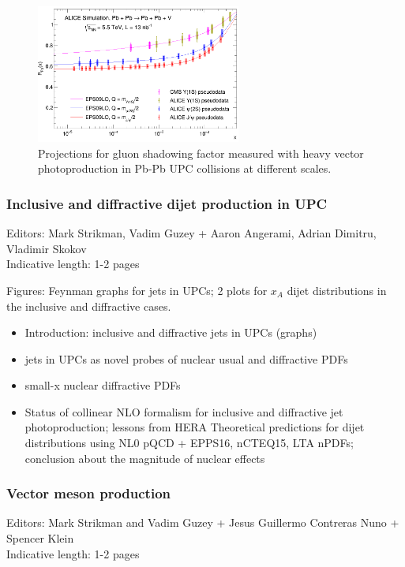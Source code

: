 \documentclass[../report.tex]{subfiles}
\begin{document}
\begin{figure}
\centering
\includegraphics[width=0.6\textwidth]{figs/suppression_factor.png}
\caption{Projections for gluon shadowing factor measured with heavy vector photoproduction in Pb-Pb UPC collisions at different scales.}
\label{fig:r}
\end{figure}

\subsubsection{Inclusive and diffractive dijet production in UPC}
Editors: Mark Strikman, Vadim Guzey + Aaron Angerami, Adrian Dimitru, Vladimir Skokov\\
Indicative length: 1-2 pages

Figures: Feynman graphs for jets in UPCs; 2 plots for $x_A$ dijet distributions in the inclusive
and diffractive cases.
\begin{itemize}
\item Introduction: inclusive and diffractive jets in UPCs (graphs)
\item jets in UPCs as novel probes of nuclear usual and diffractive PDFs
\item small-x nuclear diffractive PDFs
\item Status of collinear NLO formalism for inclusive and diffractive jet photoproduction;
lessons from HERA
Theoretical predictions for dijet distributions using NL0 pQCD + EPPS16, nCTEQ15, LTA nPDFs; conclusion about the magnitude of nuclear effects\end{itemize}

\subsubsection{Vector meson production}
Editors: Mark Strikman and Vadim Guzey + Jesus Guillermo Contreras Nuno + Spencer Klein\\
Indicative length: 1-2 pages
\end{document}
